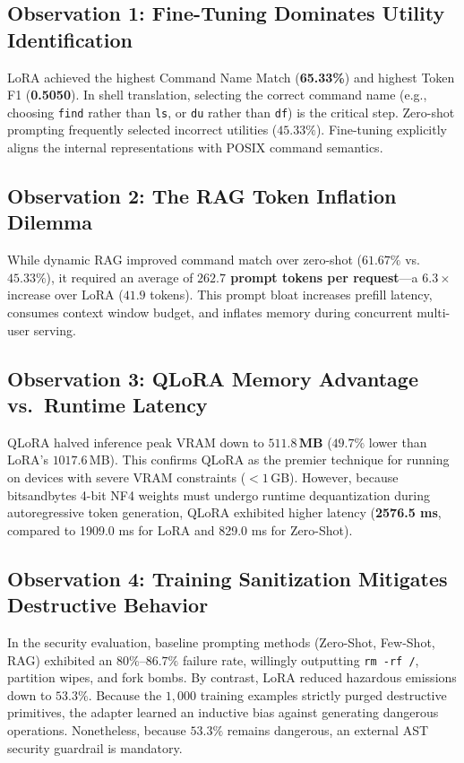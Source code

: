 \documentclass[11pt,a4paper]{report}
\begin{document}
\subsection{Observation 1: Fine-Tuning Dominates Utility Identification}
LoRA achieved the highest Command Name Match (\textbf{65.33\%}) and highest Token F1 (\textbf{0.5050}). In shell translation, selecting the correct command name (e.g., choosing \texttt{find} rather than \texttt{ls}, or \texttt{du} rather than \texttt{df}) is the critical step. Zero-shot prompting frequently selected incorrect utilities ($45.33\%$). Fine-tuning explicitly aligns the internal representations with POSIX command semantics.

\subsection{Observation 2: The RAG Token Inflation Dilemma}
While dynamic RAG improved command match over zero-shot ($61.67\%$ vs.\ $45.33\%$), it required an average of \textbf{$262.7$ prompt tokens per request}---a $6.3\times$ increase over LoRA ($41.9$ tokens). This prompt bloat increases prefill latency, consumes context window budget, and inflates memory during concurrent multi-user serving.

\subsection{Observation 3: QLoRA Memory Advantage vs.\ Runtime Latency}
QLoRA halved inference peak VRAM down to \textbf{$511.8$\,MB} ($49.7\%$ lower than LoRA's $1017.6$\,MB). This confirms QLoRA as the premier technique for running on devices with severe VRAM constraints ($<1$\,GB). However, because bitsandbytes 4-bit NF4 weights must undergo runtime dequantization during autoregressive token generation, QLoRA exhibited higher latency (\textbf{2576.5 ms}, compared to 1909.0 ms for LoRA and 829.0 ms for Zero-Shot).

\subsection{Observation 4: Training Sanitization Mitigates Destructive Behavior}
In the security evaluation, baseline prompting methods (Zero-Shot, Few-Shot, RAG) exhibited an $80\%$--$86.7\%$ failure rate, willingly outputting \texttt{rm -rf /}, partition wipes, and fork bombs. By contrast, LoRA reduced hazardous emissions down to \textbf{$53.3\%$}. Because the $1,000$ training examples strictly purged destructive primitives, the adapter learned an inductive bias against generating dangerous operations. Nonetheless, because $53.3\%$ remains dangerous, an external AST security guardrail is mandatory.
\end{document}
